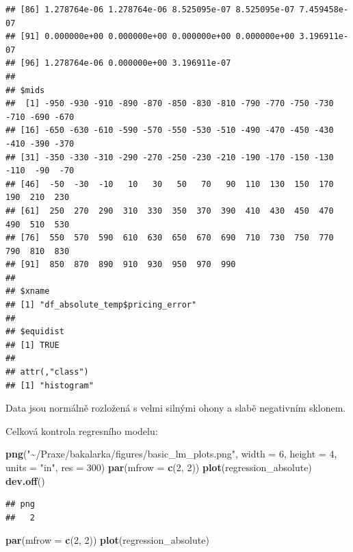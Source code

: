 \documentclass[
]{article}
\newenvironment{Shaded}{\begin{snugshade}}{\end{snugshade}}
\newcommand{\AttributeTok}[1]{\textcolor[rgb]{0.13,0.29,0.53}{#1}}
\newcommand{\DecValTok}[1]{\textcolor[rgb]{0.00,0.00,0.81}{#1}}
\newcommand{\FunctionTok}[1]{\textcolor[rgb]{0.13,0.29,0.53}{\textbf{#1}}}
\newcommand{\NormalTok}[1]{#1}
\newcommand{\StringTok}[1]{\textcolor[rgb]{0.31,0.60,0.02}{#1}}
\begin{document}
\begin{verbatim}
## [86] 1.278764e-06 1.278764e-06 8.525095e-07 8.525095e-07 7.459458e-07
## [91] 0.000000e+00 0.000000e+00 0.000000e+00 0.000000e+00 3.196911e-07
## [96] 1.278764e-06 0.000000e+00 3.196911e-07
## 
## $mids
##  [1] -950 -930 -910 -890 -870 -850 -830 -810 -790 -770 -750 -730 -710 -690 -670
## [16] -650 -630 -610 -590 -570 -550 -530 -510 -490 -470 -450 -430 -410 -390 -370
## [31] -350 -330 -310 -290 -270 -250 -230 -210 -190 -170 -150 -130 -110  -90  -70
## [46]  -50  -30  -10   10   30   50   70   90  110  130  150  170  190  210  230
## [61]  250  270  290  310  330  350  370  390  410  430  450  470  490  510  530
## [76]  550  570  590  610  630  650  670  690  710  730  750  770  790  810  830
## [91]  850  870  890  910  930  950  970  990
## 
## $xname
## [1] "df_absolute_temp$pricing_error"
## 
## $equidist
## [1] TRUE
## 
## attr(,"class")
## [1] "histogram"
\end{verbatim}

Data jsou normálně rozložená s velmi silnými ohony a slabě negativním
sklonem.

Celková kontrola regresního modelu:

\begin{Shaded}
\begin{Highlighting}[]
\FunctionTok{png}\NormalTok{(}\StringTok{"\textasciitilde{}/Praxe/bakalarka/figures/basic\_lm\_plots.png"}\NormalTok{, }\AttributeTok{width =} \DecValTok{6}\NormalTok{, }\AttributeTok{height =} \DecValTok{4}\NormalTok{, }\AttributeTok{units =} \StringTok{"in"}\NormalTok{, }\AttributeTok{res =} \DecValTok{300}\NormalTok{)}
\FunctionTok{par}\NormalTok{(}\AttributeTok{mfrow =} \FunctionTok{c}\NormalTok{(}\DecValTok{2}\NormalTok{, }\DecValTok{2}\NormalTok{))}
\FunctionTok{plot}\NormalTok{(regression\_absolute)}
\FunctionTok{dev.off}\NormalTok{()}
\end{Highlighting}
\end{Shaded}

\begin{verbatim}
## png 
##   2
\end{verbatim}

\begin{Shaded}
\begin{Highlighting}[]
\FunctionTok{par}\NormalTok{(}\AttributeTok{mfrow =} \FunctionTok{c}\NormalTok{(}\DecValTok{2}\NormalTok{, }\DecValTok{2}\NormalTok{))}
\FunctionTok{plot}\NormalTok{(regression\_absolute)}
\end{Highlighting}
\end{Shaded}
\end{document}
